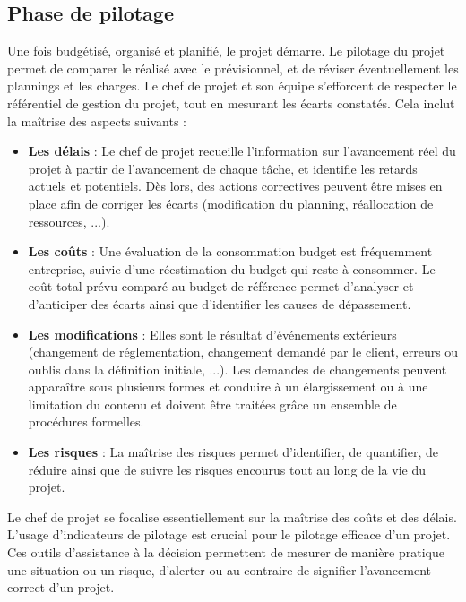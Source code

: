 \begin{spacing}{1.5}
\subsection{Phase de pilotage}
Une fois budgétisé, organisé et planifié, le projet démarre. Le pilotage du projet permet de comparer le réalisé avec le prévisionnel, et de réviser éventuellement les plannings et les charges. Le chef de projet et son équipe s'efforcent de respecter le référentiel de gestion du projet, tout en mesurant les écarts constatés. Cela inclut la maîtrise des aspects suivants :
\begin{itemize}
    \item \textbf{Les délais} : Le chef de projet recueille l'information sur l'avancement réel du projet à partir de l'avancement de chaque tâche, et identifie les retards actuels et potentiels. Dès lors, des actions correctives peuvent être mises en place afin de corriger les écarts (modification du planning, réallocation de ressources, ...).
    \item \textbf{Les coûts} : Une évaluation de la consommation budget est fréquemment entreprise, suivie d'une réestimation du budget qui reste à consommer. Le coût total prévu comparé au budget de référence permet d'analyser et d'anticiper des écarts ainsi que d'identifier les causes de dépassement.
    \item \textbf{Les modifications} : Elles sont le résultat d'événements extérieurs (changement de réglementation, changement demandé par le client, erreurs ou oublis dans la définition initiale, ...). Les demandes de changements peuvent apparaître sous plusieurs formes et conduire à un élargissement ou à une limitation du contenu et doivent être traitées grâce un ensemble de procédures formelles.
    \item \textbf{Les risques} : La maîtrise des risques permet d'identifier, de quantifier, de réduire ainsi que de suivre les risques encourus tout au long de la vie du projet.
\end{itemize}
Le chef de projet se focalise essentiellement sur la maîtrise des coûts et des délais.\\

L'usage d’indicateurs de pilotage est crucial pour le pilotage efficace d'un projet. Ces outils d'assistance à la décision permettent de mesurer de manière pratique une situation ou un risque, d'alerter ou au contraire de signifier l'avancement correct d'un projet.



\end{spacing}
